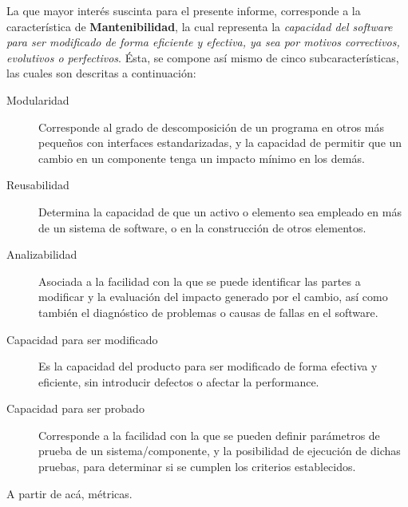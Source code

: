 La que mayor interés suscinta para el presente informe, corresponde a la característica
de \textbf{Mantenibilidad}, la cual representa la \textit{capacidad del software para ser modificado
de forma eficiente y efectiva, ya sea por motivos correctivos, evolutivos o perfectivos}.
Ésta, se compone así mismo de cinco subcaracterísticas, las cuales son descritas
a continuación:
\begin{description}
    \item [Modularidad] Corresponde al grado de descomposición de un programa en otros más pequeños
    con interfaces estandarizadas, y la capacidad de permitir que un cambio en un componente tenga
    un impacto mínimo en los demás.
    \item [Reusabilidad] Determina la capacidad de que un activo o elemento sea empleado en más
    de un sistema de software, o en la construcción de otros elementos.
    \item [Analizabilidad] Asociada a la facilidad con la que se puede identificar las partes
    a modificar y la evaluación del impacto generado por el cambio, así como también el diagnóstico
    de problemas o causas de fallas en el software.
    \item [Capacidad para ser modificado] Es la capacidad del producto para ser modificado de
    forma efectiva y eficiente, sin introducir defectos o afectar la performance.
    \item [Capacidad para ser probado] Corresponde a la facilidad con la que se pueden definir
    parámetros de prueba de un sistema/componente, y la posibilidad de ejecución de dichas pruebas,
    para determinar si se cumplen los criterios establecidos.
\end{description}

A partir de acá, métricas.